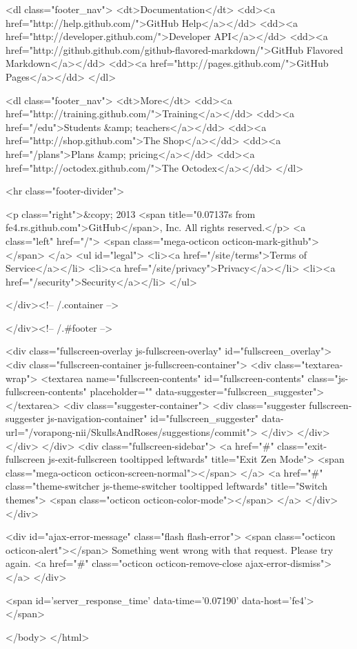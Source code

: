       <dl class="footer_nav">
        <dt>Documentation</dt>
        <dd><a href="http://help.github.com/">GitHub Help</a></dd>
        <dd><a href="http://developer.github.com/">Developer API</a></dd>
        <dd><a href="http://github.github.com/github-flavored-markdown/">GitHub Flavored Markdown</a></dd>
        <dd><a href="http://pages.github.com/">GitHub Pages</a></dd>
      </dl>

      <dl class="footer_nav">
        <dt>More</dt>
        <dd><a href="http://training.github.com/">Training</a></dd>
        <dd><a href="/edu">Students &amp; teachers</a></dd>
        <dd><a href="http://shop.github.com">The Shop</a></dd>
        <dd><a href="/plans">Plans &amp; pricing</a></dd>
        <dd><a href="http://octodex.github.com/">The Octodex</a></dd>
      </dl>

      <hr class="footer-divider">


    <p class="right">&copy; 2013 <span title="0.07137s from fe4.rs.github.com">GitHub</span>, Inc. All rights reserved.</p>
    <a class="left" href="/">
      <span class="mega-octicon octicon-mark-github"></span>
    </a>
    <ul id="legal">
        <li><a href="/site/terms">Terms of Service</a></li>
        <li><a href="/site/privacy">Privacy</a></li>
        <li><a href="/security">Security</a></li>
    </ul>

  </div><!-- /.container -->

</div><!-- /.#footer -->


    <div class="fullscreen-overlay js-fullscreen-overlay" id="fullscreen_overlay">
  <div class="fullscreen-container js-fullscreen-container">
    <div class="textarea-wrap">
      <textarea name="fullscreen-contents" id="fullscreen-contents" class="js-fullscreen-contents" placeholder="" data-suggester="fullscreen_suggester"></textarea>
          <div class="suggester-container">
              <div class="suggester fullscreen-suggester js-navigation-container" id="fullscreen_suggester"
                 data-url="/vorapong-nii/SkullsAndRoses/suggestions/commit">
              </div>
          </div>
    </div>
  </div>
  <div class="fullscreen-sidebar">
    <a href="#" class="exit-fullscreen js-exit-fullscreen tooltipped leftwards" title="Exit Zen Mode">
      <span class="mega-octicon octicon-screen-normal"></span>
    </a>
    <a href="#" class="theme-switcher js-theme-switcher tooltipped leftwards"
      title="Switch themes">
      <span class="octicon octicon-color-mode"></span>
    </a>
  </div>
</div>



    <div id="ajax-error-message" class="flash flash-error">
      <span class="octicon octicon-alert"></span>
      Something went wrong with that request. Please try again.
      <a href="#" class="octicon octicon-remove-close ajax-error-dismiss"></a>
    </div>

    
    <span id='server_response_time' data-time='0.07190' data-host='fe4'></span>
    
  </body>
</html>

